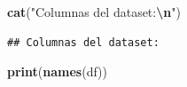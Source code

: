 \documentclass[
]{book}
\newenvironment{Shaded}{\begin{snugshade}}{\end{snugshade}}
\newcommand{\FunctionTok}[1]{\textcolor[rgb]{0.13,0.29,0.53}{\textbf{#1}}}
\newcommand{\NormalTok}[1]{#1}
\newcommand{\SpecialCharTok}[1]{\textcolor[rgb]{0.81,0.36,0.00}{\textbf{#1}}}
\newcommand{\StringTok}[1]{\textcolor[rgb]{0.31,0.60,0.02}{#1}}
\begin{document}
\begin{Shaded}
\begin{Highlighting}[]
\FunctionTok{cat}\NormalTok{(}\StringTok{"Columnas del dataset:}\SpecialCharTok{\textbackslash{}n}\StringTok{"}\NormalTok{)}
\end{Highlighting}
\end{Shaded}

\begin{verbatim}
## Columnas del dataset:
\end{verbatim}

\begin{Shaded}
\begin{Highlighting}[]
\FunctionTok{print}\NormalTok{(}\FunctionTok{names}\NormalTok{(df))}
\end{Highlighting}
\end{Shaded}
\end{document}
